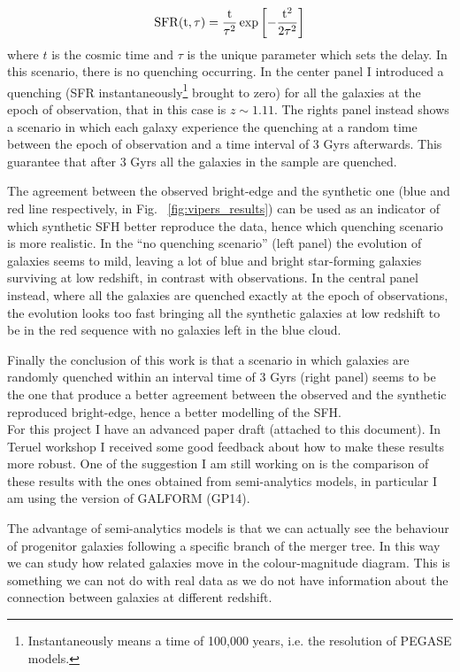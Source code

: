 \documentclass[11pt]{article}
\begin{document}
%
\begin{equation}
\label{eq:gavazzi}
\rm{SFR} (t,\tau) = \frac{t}{\tau^2}\exp{\left[-\frac{t^2}{2\tau^2}\right]}
\end{equation}
%
where $t$ is the cosmic time and $\tau$ is the unique parameter which sets the delay. In this scenario, there is no quenching occurring. In the center panel I introduced a quenching (SFR instantaneously\footnote{Instantaneously means a time of 100,000 years, i.e. the resolution of PEGASE models.} brought to zero) for all the galaxies at the epoch of observation, that in this case is $z\sim 1.11$. The rights panel instead shows a scenario in which each galaxy experience the quenching at a random time between the epoch of observation and a time interval of 3 Gyrs afterwards. This guarantee that after 3 Gyrs all the galaxies in the sample are quenched. 

The agreement between the observed bright-edge and the synthetic one (blue and red line respectively, in Fig. ~\ref{fig:vipers_results}) can be used as an indicator of which synthetic SFH better reproduce the data, hence which quenching scenario is more realistic. In the ``no quenching scenario'' (left panel) the evolution of galaxies seems to mild, leaving a lot of blue and bright star-forming galaxies surviving at low redshift, in contrast with observations. In the central panel instead, where all the galaxies are quenched exactly at the epoch of observations, the evolution looks too fast bringing all the synthetic galaxies at low redshift to be in the red sequence with no galaxies left in the blue cloud. 

Finally the conclusion of this work is that a scenario in which galaxies are randomly quenched within an interval time of 3 Gyrs (right panel) seems to be the one that produce a better agreement between the observed and the synthetic reproduced bright-edge, hence a better modelling of the SFH. \\ 

For this project I have an advanced paper draft (attached to this document). In Teruel workshop I received some good feedback about how to make these results more robust. One of the suggestion I am still working on is the comparison of these results with the ones obtained from semi-analytics models, in particular I am using the \cite{gonzalez14} version of  GALFORM (GP14).

The advantage of semi-analytics models is that we can actually see the behaviour of progenitor galaxies following a specific branch of the merger tree. In this way we can study how related galaxies move in the colour-magnitude diagram. This is something we can not do with real data as we do not have information about the connection between galaxies at different redshift.
\end{document}

